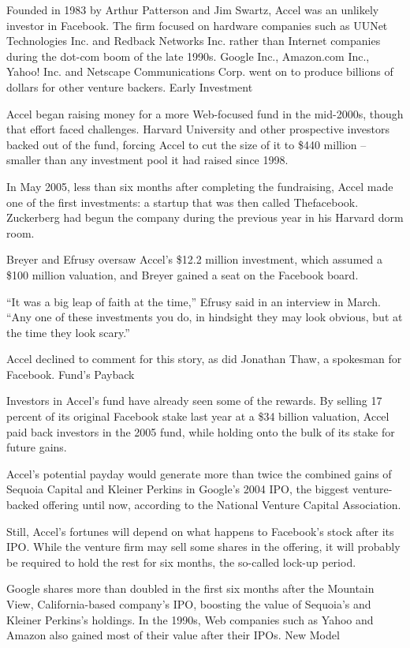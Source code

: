 \documentclass[letterpaper,12pt,english]{sphinxmanual}
\begin{document}
Founded in 1983 by Arthur Patterson and Jim Swartz, Accel was an unlikely investor in Facebook. The firm focused on hardware companies such as UUNet Technologies Inc. and Redback Networks Inc. rather than Internet companies during the dot-com boom of the late 1990s. Google Inc., Amazon.com Inc., Yahoo! Inc. and Netscape Communications Corp. went on to produce billions of dollars for other venture backers.
Early Investment

Accel began raising money for a more Web-focused fund in the mid-2000s, though that effort faced challenges. Harvard University and other prospective investors backed out of the fund, forcing Accel to cut the size of it to \$440 million -- smaller than any investment pool it had raised since 1998.

In May 2005, less than six months after completing the fundraising, Accel made one of the first investments: a startup that was then called Thefacebook. Zuckerberg had begun the company during the previous year in his Harvard dorm room.

Breyer and Efrusy oversaw Accel’s \$12.2 million investment, which assumed a \$100 million valuation, and Breyer gained a seat on the Facebook board.

“It was a big leap of faith at the time,” Efrusy said in an interview in March. “Any one of these investments you do, in hindsight they may look obvious, but at the time they look scary.”

Accel declined to comment for this story, as did Jonathan Thaw, a spokesman for Facebook.
Fund’s Payback

Investors in Accel’s fund have already seen some of the rewards. By selling 17 percent of its original Facebook stake last year at a \$34 billion valuation, Accel paid back investors in the 2005 fund, while holding onto the bulk of its stake for future gains.

Accel’s potential payday would generate more than twice the combined gains of Sequoia Capital and Kleiner Perkins in Google’s 2004 IPO, the biggest venture-backed offering until now, according to the National Venture Capital Association.

Still, Accel’s fortunes will depend on what happens to Facebook’s stock after its IPO. While the venture firm may sell some shares in the offering, it will probably be required to hold the rest for six months, the so-called lock-up period.

Google shares more than doubled in the first six months after the Mountain View, California-based company’s IPO, boosting the value of Sequoia’s and Kleiner Perkins’s holdings. In the 1990s, Web companies such as Yahoo and Amazon also gained most of their value after their IPOs.
New Model
\end{document}
